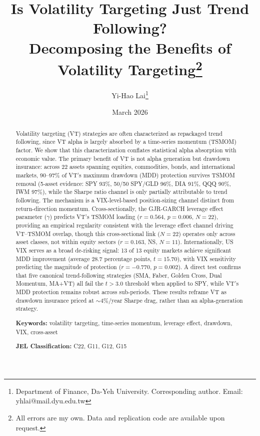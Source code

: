 \documentclass[12pt,a4paper]{article}
\title{Is Volatility Targeting Just Trend Following?\\Decomposing the Benefits of Volatility Targeting\thanks{All errors are my own. Data and replication code are available upon request.}}
\author{Yi-Hao Lai\thanks{Department of Finance, Da-Yeh University. Corresponding author. Email: yhlai@mail.dyu.edu.tw}}
\date{March 2026}
\begin{document}
\maketitle

\begin{abstract}
\noindent
Volatility targeting (VT) strategies are often characterized as repackaged trend following, since VT alpha is largely absorbed by a time-series momentum (TSMOM) factor. We show that this characterization conflates statistical alpha absorption with economic value. The primary benefit of VT is not alpha generation but drawdown insurance: across 22 assets spanning equities, commodities, bonds, and international markets, 90--97\% of VT's maximum drawdown (MDD) protection survives TSMOM removal (5-asset evidence: SPY 93\%, 50/50 SPY/GLD 96\%, DIA 91\%, QQQ 90\%, IWM 97\%), while the Sharpe ratio channel is only partially attributable to trend following. The mechanism is a VIX-level-based position-sizing channel distinct from return-direction momentum. Cross-sectionally, the GJR-GARCH leverage effect parameter ($\gamma$) predicts VT's TSMOM loading ($r = 0.564$, $p = 0.006$, $N = 22$), providing an empirical regularity consistent with the leverage effect channel driving VT--TSMOM overlap, though this cross-sectional link ($N = 22$) operates only across asset classes, not within equity sectors ($r = 0.163$, NS, $N = 11$). Internationally, US VIX serves as a broad de-risking signal: 13 of 13 equity markets achieve significant MDD improvement (average 28.7 percentage points, $t = 15.70$), with VIX sensitivity predicting the magnitude of protection ($r = -0.770$, $p = 0.002$). A direct test confirms that five canonical trend-following strategies (SMA, Faber, Golden Cross, Dual Momentum, MA+VT) all fail the \citet{harvey2016} $t > 3.0$ threshold when applied to SPY, while VT's MDD protection remains robust across sub-periods. These results reframe VT as drawdown insurance priced at ${\sim}4\%$/year Sharpe drag, rather than an alpha-generation strategy.

\medskip
\noindent
\textbf{Keywords:} volatility targeting, time-series momentum, leverage effect, drawdown, VIX, cross-asset

\medskip
\noindent
\textbf{JEL Classification:} C22, G11, G12, G15
\end{abstract}

\newpage

\end{document}
